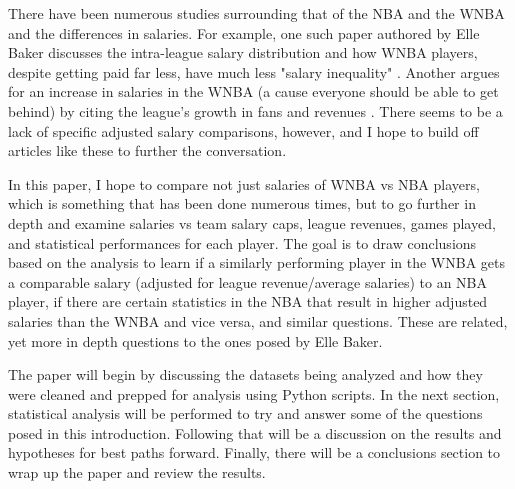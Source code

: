 \documentclass[12pt]{article}
\begin{document}
\par
There have been numerous studies surrounding that of the NBA and the WNBA and the differences in salaries.
For example, one such paper authored by Elle Baker discusses the intra-league salary distribution and
how WNBA players, despite getting paid far less, have much less "salary inequality"
\cite{baker2020comparison}. Another argues for an increase in salaries in the WNBA (a cause everyone
should be able to get behind) by citing the league's growth in fans and revenues \cite{ettienne2019s}.
There seems to be a lack of specific adjusted salary comparisons, however, and I hope to build off articles
like these to further the conversation.
\par
In this paper, I hope to compare not just salaries of WNBA vs NBA players, which is something that has been done numerous times, but to go further in depth and examine salaries vs team salary caps, league revenues, games played, and statistical performances for each player. The goal is to draw conclusions based on the analysis to learn if a similarly performing player in the WNBA gets a comparable salary (adjusted for league revenue/average salaries) to an NBA player, if there are certain statistics in the NBA that result in higher adjusted salaries than the WNBA and vice versa, and similar questions. These are related, yet more in depth questions to the ones posed by Elle Baker.
\par
The paper will begin by discussing the datasets being analyzed and how they were cleaned and prepped for analysis using Python scripts. In the next section, statistical analysis will be performed to try and answer some of the questions posed in this introduction. Following that will be a discussion on the results and hypotheses for best paths forward. Finally, there will be a conclusions section to wrap up the paper and review the results.
\end{document}
